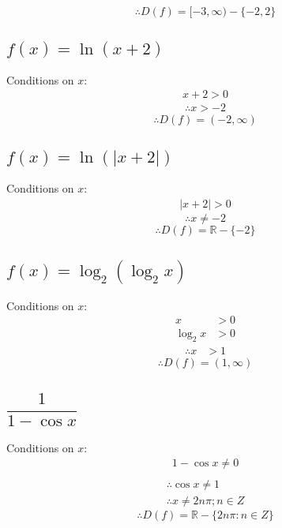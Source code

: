 \documentclass[fleqn, a4paper, 10pt]{article}
\begin{document}
\begin{equation*}
	\boxed{\therefore D(f) = [-3, \infty) - \{-2, 2\}}
\end{equation*}

\subsection{$f(x) = \ln(x+2)$}

Conditions on $x$:
\begin{align}
	x + 2 > 0
\end{align}
\begin{align*}
	\therefore x > -2
\end{align*}
\begin{equation*}
	\boxed{\therefore D(f) = (-2, \infty)}
\end{equation*}

\subsection{$f(x) = \ln(|x+2|)$}

Conditions on $x$:
\begin{align}
	|x + 2| > 0
\end{align}
\begin{equation*}
	\therefore x \neq -2
\end{equation*}
\begin{equation*}
	\boxed{\therefore D(f) = \mathbb{R} - \{-2\}}
\end{equation*}

\subsection{$f(x) = \log_2 (\log_2 x)$}

Conditions on $x$:
\begin{align}
	x &> 0\\
	\log_2 x &> 0
\end{align}
\begin{align*}
	\therefore x &> 1
\end{align*}
\begin{equation*}
	\boxed{\therefore D(f) = (1, \infty)}
\end{equation*}

\subsection{$\dfrac{1}{1 - \cos x}$}

Conditions on $x$:
\begin{align}
	1 - \cos x \neq 0\\
\end{align}
\begin{align*}
	\therefore \cos x \neq 1\\
	\therefore x \neq 2n\pi ; n \in Z
\end{align*}
\begin{equation*}
	\boxed{\therefore D(f) = \mathbb{R} - \{2n\pi : n \in Z\}}
\end{equation*}
\end{document}
